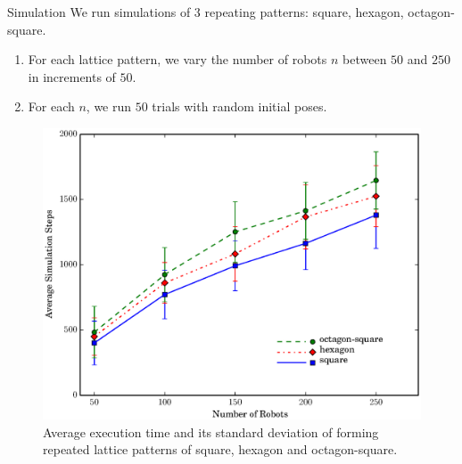 \begin{frame}{Simulation}
We run simulations of $3$ repeating patterns: square, hexagon, octagon-square.
   \begin{enumerate}
   \item For each lattice pattern, we vary the number of robots $n$ between $50$ and $250$ in increments of $50$. 
   \item For each $n$, we run $50$ trials with random initial poses.
   \end{enumerate} 
    \begin{figure}
        \centering
        \includegraphics[width=\textwidth]{figs/exp_time}
        \caption{Average execution time and its standard deviation of forming repeated lattice patterns of square, hexagon and octagon-square.} 
    \end{figure}
\end{frame}